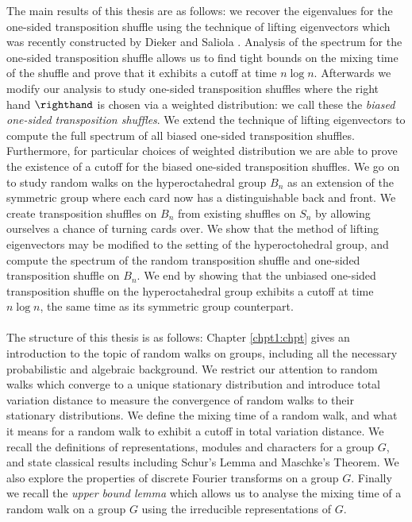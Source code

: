 \documentclass[11pt]{report}
\begin{document}
The main results of this thesis are as follows: we recover the eigenvalues for the one-sided transposition shuffle using the technique of lifting eigenvectors which was recently constructed by Dieker and Saliola \cite{dieker2018spectral}. Analysis of the spectrum for the one-sided transposition shuffle allows us to find tight bounds on the mixing time of the shuffle and prove that it exhibits a cutoff at time $n\log n$. Afterwards we modify our analysis to study one-sided transposition shuffles where the right hand  $\righthand$ is chosen via a weighted distribution: we call these the \emph{biased one-sided transposition shuffles}.  We extend the technique of lifting eigenvectors to compute the full spectrum of all biased one-sided transposition shuffles. Furthermore, for particular choices of weighted distribution we are able to  prove the existence of a cutoff for the biased one-sided transposition shuffles. We go on to study random walks on the hyperoctahedral group $B_{n}$ as an extension of the symmetric group where each card now has a distinguishable back and front. We create transposition shuffles on $B_{n}$ from existing shuffles on $S_{n}$ by allowing ourselves a chance of turning cards over. We show that the method of lifting eigenvectors may be modified to the setting of the hyperoctohedral group, and compute the spectrum of the random transposition shuffle and one-sided transposition shuffle on $B_{n}$. We end by showing that the unbiased one-sided transposition shuffle on the hyperoctahedral group exhibits a cutoff at time $n\log n$, the same time as its symmetric group counterpart.



\paragraph{}
The structure of this thesis is as follows:
Chapter \ref{chpt1:chpt} gives an introduction to the topic of random walks on groups, including all the necessary probabilistic and algebraic background. We restrict our attention to random walks which converge to a unique stationary distribution and introduce total variation distance to  measure the convergence of random walks to their stationary distributions. We define the mixing time of a random walk, and what it means for a random walk to exhibit a cutoff in total variation distance. We recall the definitions of representations, modules and characters for a group $G$, and state classical results including Schur's Lemma and Maschke's Theorem. We also explore the properties of discrete Fourier transforms on a group $G$. Finally we recall the \emph{upper bound lemma} which allows us to analyse the mixing time of a random walk on a group $G$ using the  irreducible representations of $G$. 
\end{document}
